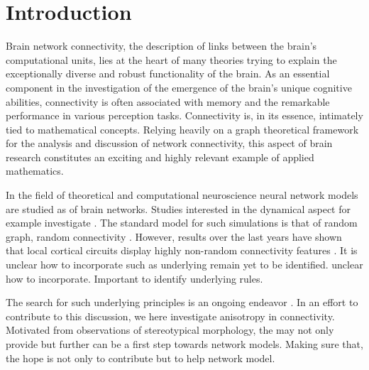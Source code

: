 \chapter{Introduction}\label{ch:Introduction} 

Brain network connectivity, the description of links between the
brain's computational units, lies at the heart of many theories trying
to explain the exceptionally diverse and robust functionality of the
brain. As an essential component in the investigation of the emergence
of the brain's unique cognitive abilities, connectivity is often
associated with memory and the remarkable performance in various
perception tasks. Connectivity is, in its essence, intimately tied to
mathematical concepts. Relying heavily on a graph theoretical
framework for the analysis and discussion of network connectivity,
this aspect of brain research constitutes an exciting and highly
relevant example of applied mathematics.



In the field of theoretical and computational neuroscience neural
network models are studied as of brain networks. Studies interested in
the dynamical aspect for example investigate . The standard model for
such simulations is that of random graph, random
connectivity \parencite{Brunel2000}. However, results over the last
years have shown that local cortical circuits display highly
non-random connectivity features \parencite{Song2005, Perin2011}. It
is unclear how to incorporate such as underlying remain yet to be
identified.  unclear how to incorporate. Important to identify
underlying rules.

The search for such underlying principles is an ongoing
endeavor \parencite{Klinshov2014}. In an effort to contribute to this
discussion, we here investigate anisotropy in connectivity. Motivated
from observations of stereotypical morphology, the may not only
provide but further can be a first step towards network models. Making
sure that, the hope is not only to contribute but to help network
model.


